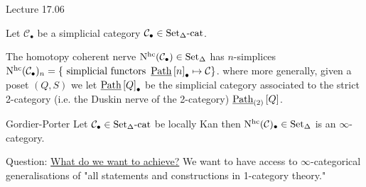 Lecture 17.06

Let $\mathcal{ C }_\bullet $ be a simplicial category $ \mathcal{ C }_\bullet \in \operatorname{Set_{ \Delta }-cat} $.

\begin{defi}
	The homotopy coherent nerve $ \operatorname{N^{hc}} ( \mathcal{ C }_{ \bullet } ) \in \operatorname{Set}_{\Delta} $ has $ n $-simplices $ \operatorname{N^{hc}} ( \mathcal{ C }_{ \bullet } )_n = \{ \text{ simplicial functors } \operatorname{\underline{Path}} \left[ n  \right]_{ \bullet } \mapsto \mathcal{ C } \} $.
	where more generally, given a poset $ ( Q , S ) $ we let $ \operatorname{\underline{Path}} \left[ Q \right]_{ \bullet } $ be the simplicial category associated to the strict 2-category (i.e. the Duskin nerve of the 2-category) $ \operatorname{\underline{Path}}_{ ( 2 ) } \left[ Q \right] $.
\end{defi} 

\begin{thm}{Gordier-Porter}
	Let $ \mathcal{ C }_\bullet \in \operatorname{Set_{ \Delta }-cat} $ be locally Kan then $ \operatorname{N^{hc}} ( \mathcal{ C } )_\bullet \in \operatorname{Set}_\Delta $ is an $ \infty $-category.
\end{thm}

Question: \underline{What do we want to achieve?}
We want to have access to $ \infty $-categorical generalisations of "all statements and constructions in 1-category theory."

